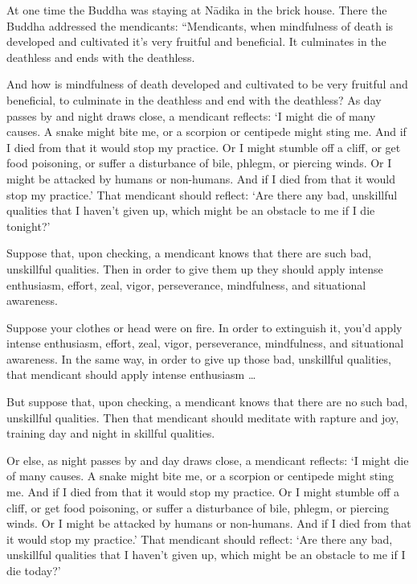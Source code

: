 \documentclass[12pt,openany]{book}%
\begin{document}
At one time the Buddha was staying at \textsanskrit{Nādika} in the brick house. There the Buddha addressed the mendicants: “Mendicants, when mindfulness of death is developed and cultivated it’s very fruitful and beneficial. It culminates in the deathless and ends with the deathless. 

And how is mindfulness of death developed and cultivated to be very fruitful and beneficial, to culminate in the deathless and end with the deathless? As day passes by and night draws close, a mendicant reflects: ‘I might die of many causes. A snake might bite me, or a scorpion or centipede might sting me. And if I died from that it would stop my practice. Or I might stumble off a cliff, or get food poisoning, or suffer a disturbance of bile, phlegm, or piercing winds. Or I might be attacked by humans or non-humans. And if I died from that it would stop my practice.’ That mendicant should reflect: ‘Are there any bad, unskillful qualities that I haven’t given up, which might be an obstacle to me if I die tonight?’ 

Suppose that, upon checking, a mendicant knows that there are such bad, unskillful qualities. Then in order to give them up they should apply intense enthusiasm, effort, zeal, vigor, perseverance, mindfulness, and situational awareness. 

Suppose your clothes or head were on fire. In order to extinguish it, you’d apply intense enthusiasm, effort, zeal, vigor, perseverance, mindfulness, and situational awareness. In the same way, in order to give up those bad, unskillful qualities, that mendicant should apply intense enthusiasm … 

But suppose that, upon checking, a mendicant knows that there are no such bad, unskillful qualities. Then that mendicant should meditate with rapture and joy, training day and night in skillful qualities. 

Or else, as night passes by and day draws close, a mendicant reflects: ‘I might die of many causes. A snake might bite me, or a scorpion or centipede might sting me. And if I died from that it would stop my practice. Or I might stumble off a cliff, or get food poisoning, or suffer a disturbance of bile, phlegm, or piercing winds. Or I might be attacked by humans or non-humans. And if I died from that it would stop my practice.’ That mendicant should reflect: ‘Are there any bad, unskillful qualities that I haven’t given up, which might be an obstacle to me if I die today?’ 
\end{document}
